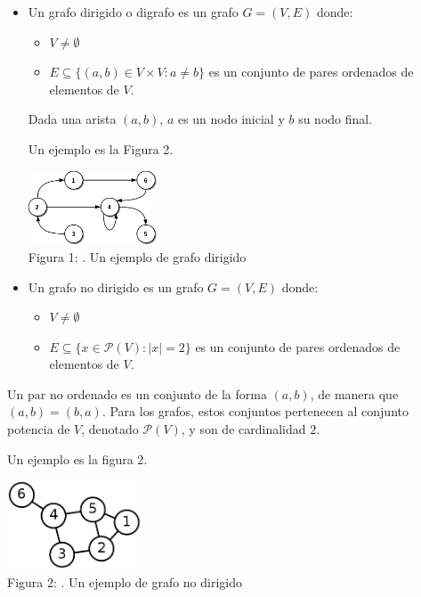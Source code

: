 \documentclass[10pt]{article}
\begin{document}
\begin{itemize}
\item Un grafo dirigido o digrafo es un grafo $G = (V,E)$ donde:
\begin{itemize}
\item $V\not= \emptyset$
\item $E \subseteq \{(a,b) \in V\times V \colon a \not= b\}$ es un conjunto de pares ordenados de elementos de $V$.
\end{itemize}
Dada una arista $(a,b)$, $a$ es un nodo inicial y $b$ su nodo final.

Un ejemplo es la Figura 2. \\
\begin{center}
\includegraphics[width=0.3\textwidth]{grafodirigido} \\
Figura 1: . Un ejemplo de grafo dirigido
\end{center} 






\item Un grafo no dirigido es un grafo $G = (V,E)$ donde:
\begin{itemize}
\item $V\not= \emptyset$
\item $E \subseteq \{x \in \mathcal{P}(V) \colon |x|=2\}$ es un conjunto de pares ordenados de elementos de $V$.
\end{itemize}
\end{itemize}
Un par no ordenado es un conjunto de la forma $(a,b)$, de manera que $(a,b)=(b,a)$. Para los grafos, estos conjuntos pertenecen al conjunto potencia de $V$, denotado $\mathcal{P}(V)$, y son de cardinalidad $2$.

Un ejemplo es la figura 2. \\
\begin{center}
\includegraphics[width=0.3\textwidth]{grafo} \\
Figura 2: . Un ejemplo de grafo no dirigido
\end{center}
\end{document}
